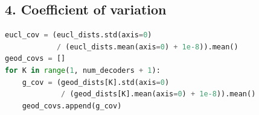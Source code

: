 \documentclass[10pt,a4paper]{article}
\begin{document}
\subsection*{4. Coefficient of variation}

\begin{lstlisting}[language=Python, caption={CoV computation (ensemble\_vae.py)}]
eucl_cov = (eucl_dists.std(axis=0)
            / (eucl_dists.mean(axis=0) + 1e-8)).mean()
geod_covs = []
for K in range(1, num_decoders + 1):
    g_cov = (geod_dists[K].std(axis=0)
             / (geod_dists[K].mean(axis=0) + 1e-8)).mean()
    geod_covs.append(g_cov)
\end{lstlisting}

\newpage



\end{document}
